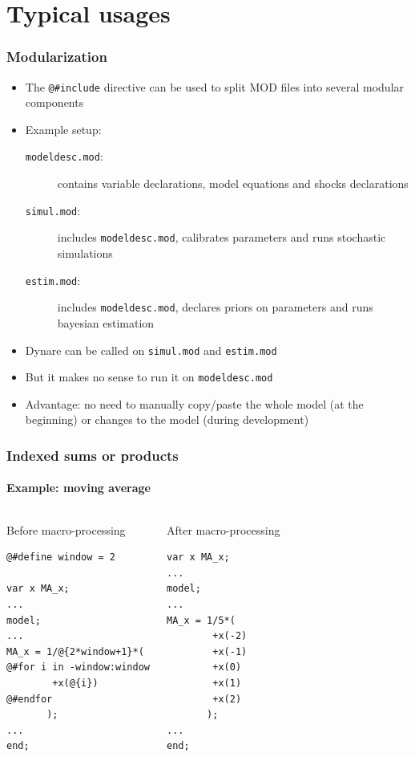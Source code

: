 \documentclass{beamer}
\begin{document}
\section{Typical usages}

\begin{frame}[fragile=singleslide]
  \frametitle{Modularization}
  \begin{itemize}
  \item The \verb+@#include+ directive can be used to split MOD files into several modular components
  \item Example setup:
    \begin{description}
    \item[\texttt{modeldesc.mod}:] contains variable declarations, model equations and shocks declarations
    \item[\texttt{simul.mod}:] includes \texttt{modeldesc.mod}, calibrates parameters and runs stochastic simulations
    \item[\texttt{estim.mod}:] includes \texttt{modeldesc.mod}, declares priors on parameters and runs bayesian estimation
    \end{description}
  \item Dynare can be called on \texttt{simul.mod} and \texttt{estim.mod}
  \item But it makes no sense to run it on \texttt{modeldesc.mod}
  \item Advantage: no need to manually copy/paste the whole model (at the beginning) or changes to the model (during development)
  \end{itemize}
\end{frame}

\begin{frame}[fragile=singleslide]
  \frametitle{Indexed sums or products}
  \framesubtitle{Example: moving average}
  \begin{columns}[T]
    \begin{block}{Before macro-processing}
\begin{verbatim}
@#define window = 2

var x MA_x;
...
model;
...
MA_x = 1/@{2*window+1}*(
@#for i in -window:window
        +x(@{i})
@#endfor
       );
...
end;
\end{verbatim}
    \end{block}
    \begin{block}{After macro-processing}
\begin{verbatim}
var x MA_x;
...
model;
...
MA_x = 1/5*(
        +x(-2)
        +x(-1)
        +x(0)
        +x(1)
        +x(2)
       );
...
end;
\end{verbatim}
    \end{block}
  \end{columns}
\end{frame}
\end{document}
